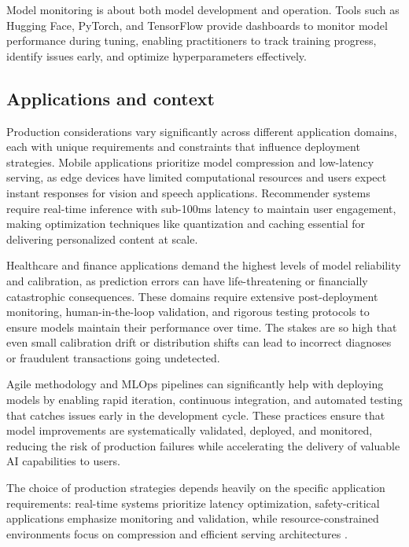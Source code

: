 \begin{remark}
Model monitoring is about both model development and operation. Tools such as Hugging Face, PyTorch, and TensorFlow provide dashboards to monitor model performance during tuning, enabling practitioners to track training progress, identify issues early, and optimize hyperparameters effectively.
\end{remark}

\subsection{Applications and context}

Production considerations vary significantly across different application domains, each with unique requirements and constraints that influence deployment strategies. Mobile applications prioritize model compression and low-latency serving, as edge devices have limited computational resources and users expect instant responses for vision and speech applications. Recommender systems require real-time inference with sub-100ms latency to maintain user engagement, making optimization techniques like quantization and caching essential for delivering personalized content at scale.

Healthcare and finance applications demand the highest levels of model reliability and calibration, as prediction errors can have life-threatening or financially catastrophic consequences. These domains require extensive post-deployment monitoring, human-in-the-loop validation, and rigorous testing protocols to ensure models maintain their performance over time. The stakes are so high that even small calibration drift or distribution shifts can lead to incorrect diagnoses or fraudulent transactions going undetected.

\begin{remark}
Agile methodology and MLOps pipelines can significantly help with deploying models by enabling rapid iteration, continuous integration, and automated testing that catches issues early in the development cycle. These practices ensure that model improvements are systematically validated, deployed, and monitored, reducing the risk of production failures while accelerating the delivery of valuable AI capabilities to users.
\end{remark}

The choice of production strategies depends heavily on the specific application requirements: real-time systems prioritize latency optimization, safety-critical applications emphasize monitoring and validation, while resource-constrained environments focus on compression and efficient serving architectures \textcite{Ronneberger2015,Prince2023}.
